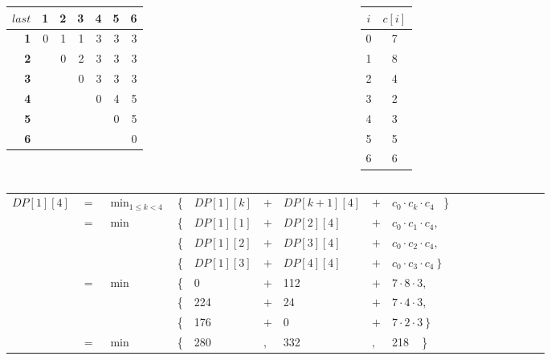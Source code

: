 \begin{frame}{}

\begingroup
\renewcommand*{\arraystretch}{1.0}
\vspace{-6pt}
\begin{columns}[T]
\begin{tabular}{|r|r|r|r|r|r|r|}
\hline
$\mathit{last}$ &  \textbf{1} & \textbf{2} & \textbf{3} & \textbf{4} & \textbf{5} & \textbf{6} \\\hline
\textbf{1} & \phantom{00}0 & \phantom{00}1 & \phantom{00}1 & \phantom{00}\alert{3} & \phantom{00}3 & \phantom{00}3 \\\hline
\textbf{2} &   & 0 & 2 & 3 & 3 & 3 \\\hline
\textbf{3} &   &   & 0 & 3 & 3 & 3 \\\hline
\textbf{4} &   &   &   & 0 & 4 & 5 \\\hline
\textbf{5} &   &   &   &   & 0 & 5 \\\hline
\textbf{6} &   &   &   &   &   & 0 \\\hline
\end{tabular}
\begin{tabular}{|c|c|}
\hline
$i$ & $c[i]$ \\\hline
0 & 7 \\\hline
1 & 8 \\\hline
2 & 4 \\\hline
3 & 2 \\\hline
4 & 3 \\\hline
5 & 5 \\\hline
6 & 6 \\\hline
\end{tabular}
\end{columns}

\medskip
\setlength{\tabcolsep}{3pt}
\begin{tabular}{lllllllllllllllll}
$DP[1][4]$ & $=$ & $\displaystyle\min_{1 \leq k < 4}$ & \{ & $DP[1][k]$ & $+$ & $DP[k+1][4]$ & $+$ & $c_0 \cdot c_k \cdot c_4$ ~\} \\
        & $=$      & $\min$ & \{ & $DP[1][1]$ & $+$ & $DP[2][4]$ & $+$ & $c_0 \cdot c_1 \cdot c_4,$ \\
         &     &        & \{ & $DP[1][2]$ & $+$ & $DP[3][4]$ & $+$ & $c_0 \cdot c_2 \cdot c_4,$ \\
         &     &        & \{ & $DP[1][3]$ & $+$ & $DP[4][4]$ & $+$ & $c_0 \cdot c_3 \cdot c_4 ~\}$ \\
         &  $=$   & $\min$ & \{ & 0 & $+$ & 112 & $+$ & $7 \cdot 8 \cdot 3,$ \\
          &    &        & \{ & 224  & $+$ & 24 & $+$ & $7 \cdot 4 \cdot 3,$ \\
          &    &        & \{ & 176 & $+$ & 0 & $+$ & $7 \cdot 2 \cdot 3 ~\}$ \\
         &  $=$   & $\min$ & \{ & 280 & $,$ & 332 & $,$ & \alert{218} ~ \} \\
\end{tabular}
\endgroup

\end{frame}



